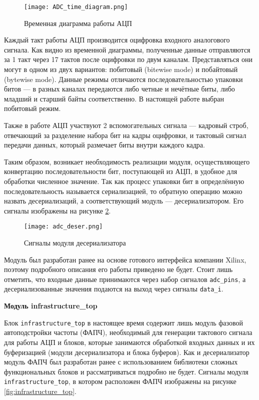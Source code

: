 \begin{figure}[ht]
    \centering
    \texttt{[image: ADC\_time\_diagram.png]}
    \caption{Временная диаграмма работы АЦП}
    \label{fig:ADC_time_diagram}
\end{figure}
Каждый такт работы АЦП производится оцифровка входного аналогового сигнала. Как видно из временной диаграммы, полученные данные отправляются за 1 такт через 17 тактов после оцифровки по двум каналам. Представляться они могут в одном из двух вариантов: побитовый (bitewise mode) и побайтовый (bytewise mode). Данные режимы отличаются последовательностью упаковки битов --- в разных каналах передаются либо четные и нечётные биты, либо младший и старший байты соответственно. В настоящей работе выбран побитовый режим.\par
Также в работе АЦП участвуют 2 вспомогательных сигнала --- кадровый строб, отвечающий за разделение набора бит на кадры оцифровки, и тактовый сигнал передачи данных, который размечает биты внутри каждого кадра.\par
Таким образом, возникает необходимость реализации модуля, осуществляющего конвертацию последовательности бит, поступающей из АЦП, в удобное для обработки численное значение. Так как процесс упаковки бит в определённую последовательность называется сериализацией, то обратную операцию можно назвать десериализаций, а соответствующий модуль --- десериализатором. Его сигналы изображены на рисунке \ref{fig:adc_deser}.\par
\begin{figure}[ht]
    \centering
    \texttt{[image: adc\_deser.png]}
    \caption{Сигналы модуля десериализатора}
    \label{fig:adc_deser}
\end{figure}
Модуль был разработан ранее на основе готового интерфейса компании Xilinx, поэтому подробного описания его работы приведено не будет. Стоит лишь отметить, что входные данные принимаются через набор сигналов \texttt{adc\_pins}, а десериализованные значения подаются на выход через сигналы \texttt{data\_i}.\par
\textbf{Модуль infrastructure\_top}\par
Блок \texttt{infrastructure\_top} в настоящее время содержит лишь модуль фазовой автоподстройки частоты (ФАПЧ), необходимый для генерации тактового сигнала для работы АЦП и блоков, которые занимаются обработкой входных данных и их буферизацией (модули десериализатора и блока буферов). Как и десериализатор модуль ФАПЧ был разработан ранее с использованием библиотеки сложных функциональных блоков и рассматриваться подробно не будет. Сигналы модуля \texttt{infrastructure\_top}, в котором расположен ФАПЧ изображены на рисунке \ref{fig:infrastructure_top}.\par
